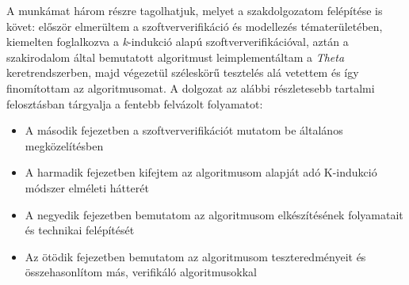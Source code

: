 \newline
\newline
A munkámat három részre tagolhatjuk, melyet a szakdolgozatom felépítése is követ: először elmerültem a szoftververifikáció és modellezés tématerületében, kiemelten foglalkozva a \emph{k}-indukció alapú szoftververifikációval, aztán a szakirodalom által bemutatott algoritmust leimplementáltam a \emph{Theta} keretrendszerben, majd végezetül széleskörű tesztelés alá vetettem és így finomítottam az algoritmusomat.
\newline
\newline
A dolgozat az alábbi részletesebb tartalmi felosztásban tárgyalja a fentebb felvázolt folyamatot:
\begin{itemize}
	\item A második fejezetben a szoftververifikációt mutatom be általános megközelítésben
	\item A harmadik fejezetben kifejtem az algoritmusom alapját adó K-indukció módszer elméleti hátterét
	\item A negyedik fejezetben bemutatom az algoritmusom elkészítésének folyamatait és technikai felépítését
	\item Az ötödik fejezetben bemutatom az algoritmusom teszteredményeit és összehasonlítom más, verifikáló algoritmusokkal
\end{itemize}
